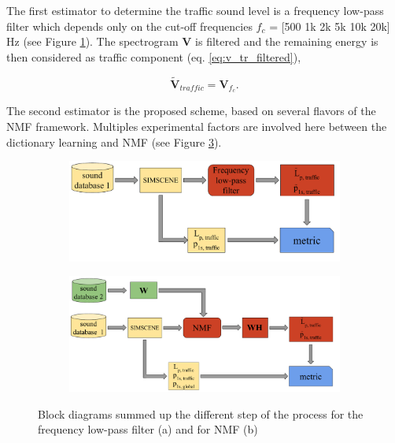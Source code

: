\documentclass[twocolumn,a4paper,10pt]{article}
\begin{document}
The first estimator to determine the traffic sound level is a frequency low-pass filter which depends only on the cut-off frequencies $f_c$ = [500 1k 2k 5k 10k 20k] Hz (see Figure \ref{fig:bloc_filtre}). The spectrogram $\mathbf{V}$ is filtered and the remaining energy is then considered as traffic component (eq. \ref{eq:v_tr_filtered}),

\begin{equation}\label{eq:v_tr_filtered}
\mathbf{\tilde{V}}_{traffic} = \mathbf{V}_{f_c}.
\end{equation}

The second estimator is the proposed scheme, based on several flavors of the NMF framework. Multiples experimental factors are involved here between the dictionary learning and NMF (see Figure \ref{fig:bloc_nmf}).

\begin{figure}

    \centering
    \begin{subfigure}[t]{0.45\textwidth}
        \centering
        \includegraphics[width=\linewidth]{figures/bloc_diagram_filtrage_EN.pdf}
  		\caption{}
  		\label{fig:bloc_filtre}
    \end{subfigure}%
    \vfill
    \begin{subfigure}[t]{0.45\textwidth}
        \centering
        \includegraphics[width=\linewidth]{figures/bloc_diagram_NMF_EN.pdf}
		\caption{}
		\label{fig:bloc_nmf}
    \end{subfigure}

    \caption{Block diagrams summed up the different step of the process for the frequency low-pass filter (a) and for NMF (b)}
\end{figure}
\end{document}
